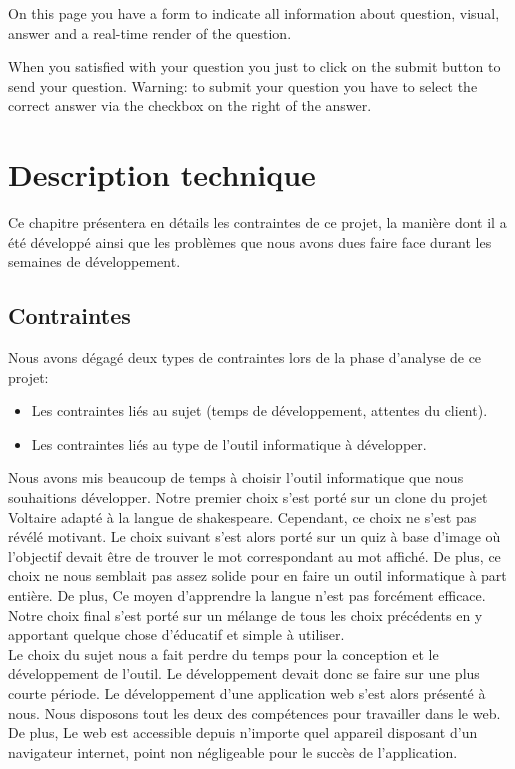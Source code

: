 \documentclass[a4paper,11pt, oneside]{book}
\begin{document}
On this page you have a form to indicate all information about question, visual, answer and a real-time render of the question.

When you satisfied with your question you just to click on the submit button to send your question.
Warning: to submit your question you have to select the correct answer via the checkbox on the right of the answer.

\newpage
\chapter{Description technique}

	Ce chapitre présentera en détails les contraintes de ce projet, la manière dont il a été développé ainsi que les problèmes que nous avons dues faire face
	durant les semaines de développement.

	\section{Contraintes}

	Nous avons dégagé deux types de contraintes lors de la phase d'analyse de ce projet:
	\begin{itemize}
		\item Les contraintes liés au sujet (temps de développement, attentes du client).
		\item Les contraintes liés au type de l'outil informatique à développer.\\
	\end{itemize}
Nous avons mis beaucoup de temps à choisir l'outil informatique que nous souhaitions développer. Notre premier choix s'est porté sur un clone du projet Voltaire adapté à la langue de shakespeare.
Cependant, ce choix ne s'est pas révélé motivant. Le choix suivant s'est alors porté sur un quiz à base d'image où l'objectif devait être de trouver le mot correspondant au mot affiché. De plus, ce choix
ne nous semblait pas assez solide pour en faire un outil informatique à part entière. De plus, Ce moyen d'apprendre la langue n'est pas forcément efficace.
Notre choix final s'est porté sur un mélange de tous les choix précédents en y apportant quelque chose d'éducatif et simple à utiliser.\\

Le choix du sujet nous a fait perdre du temps pour la conception et le développement de l'outil. Le développement devait donc se faire sur une plus courte période.
Le développement d'une application web s'est alors présenté à nous. Nous disposons tout les deux des compétences pour travailler dans le web.
De plus, Le web est accessible depuis n'importe quel appareil disposant d'un navigateur internet, point non négligeable pour le succès de l'application.\\
\end{document}

